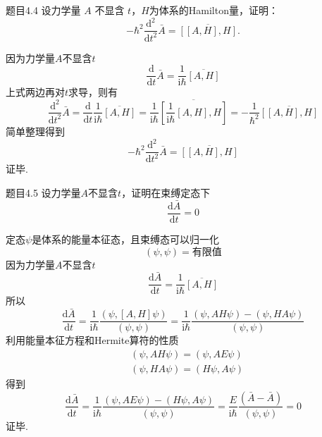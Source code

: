 \begin{question}{题目4.4}
    设力学量 $A$ 不显含 $t$，$H$为体系的Hamilton量，证明：
    $$
        -\hbar^2\frac{\mathrm{d}^2}{\mathrm{d}t^2}\bar{A} = \overline{[[A, H], H]}.
    $$
\end{question}
\begin{solution}
    因为力学量$A$不显含$t$
    $$
        \frac{\mathrm{d}}{\mathrm{d}t}\bar{A}=\frac{1}{\mathrm{i}\hbar}\overline{[A, H]}
    $$
    上式两边再对$t$求导，则有
    $$
        \frac{\mathrm{d}^2}{\mathrm{d}t^2}\bar{A}
        =\frac{\mathrm{d}}{\mathrm{d}t}\frac{1}{\mathrm{i}\hbar}\overline{[A, H]}
        =\frac{1}{\mathrm{i}\hbar}\overline{\left[\frac{1}{\mathrm{i}\hbar}[A, H], H\right]}
        =-\frac{1}{\hbar^2}\overline{\left[[A, H], H\right]}
    $$
    简单整理得到
    $$
        -\hbar^2\frac{\mathrm{d}^2}{\mathrm{d}t^2}\bar{A} = \overline{[[A, H], H]}
    $$
    证毕.
\end{solution}




\begin{question}{题目4.5}
    设力学量$A$不显含$t$，证明在束缚定态下
    $$
        \frac{\mathrm{d}\bar{A}}{\mathrm{d}t} = 0
    $$
\end{question}
\begin{solution}
    定态$\psi$是体系的能量本征态，且束缚态可以归一化
    $$
        (\psi, \psi) = \text{有限值}
    $$
    因为力学量$A$不显含$t$
    $$
        \frac{\mathrm{d}\bar{A}}{\mathrm{d}t}=\frac{1}{\mathrm{i}\hbar}\overline{[A, H]}
    $$
    所以
    $$
        \frac{\mathrm{d}\bar{A}}{\mathrm{d}t}
        =\frac{1}{\mathrm{i}\hbar}\frac{(\psi, [A,H]\psi)}{(\psi, \psi)}
        =\frac{1}{\mathrm{i}\hbar}\frac{(\psi, AH\psi)-(\psi, HA\psi)}{(\psi, \psi)}
    $$
    利用能量本征方程和Hermite算符的性质
    $$
        \begin{aligned}
             & (\psi, AH\psi) = (\psi, AE\psi) \\
             & (\psi, HA\psi) = (H\psi, A\psi)
        \end{aligned}
    $$
    得到
    $$
        \frac{\mathrm{d}\bar{A}}{\mathrm{d}t}
        =\frac{1}{\mathrm{i}\hbar}\frac{(\psi, AE\psi)-(H\psi, A\psi)}{(\psi, \psi)}
        =\frac{E}{\mathrm{i}\hbar}\frac{(\bar{A}-\bar{A})}{(\psi, \psi)}
        =0
    $$
    证毕.
\end{solution}





